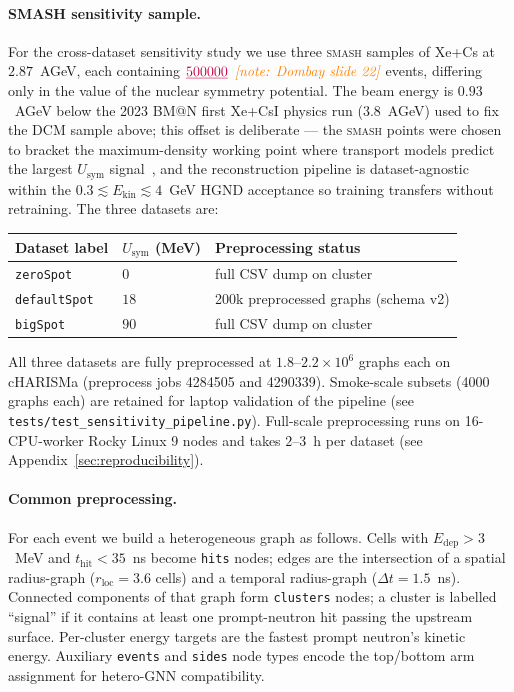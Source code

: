 \documentclass[aps,prc,twocolumn,superscriptaddress,showpacs,%
               nofootinbib,floatfix,longbibliography]{revtex4-2}
\makeatletter
\newcommand{\NOTE}[1]{{\color{orange}\textit{[note: #1]}}}
\newcommand{\NUM}[3]{{\color{purple}\underline{#1}~#2}\,\NOTE{#3}}
\newcommand{\Ekin}{E_{\text{kin}}}
\newcommand{\Usym}{U_{\text{sym}}}
\newcommand{\HGND}{HGND}
\newcommand{\BMN}{BM@N}
\newcommand{\SMASH}{\textsc{smash}}
\makeatother
\begin{document}
\paragraph*{SMASH sensitivity sample.}
For the cross-dataset sensitivity study we use three \SMASH{}
\cite{SMASH}
samples of Xe+Cs at $2.87$~AGeV, each containing
$\NUM{500000}{}{Dombay slide 22}$ events, differing only in the
value of the nuclear symmetry potential.  The beam energy is
$0.93$~AGeV below the 2023 \BMN{} first Xe+CsI physics run
($3.8$~AGeV) used to fix the DCM sample above; this offset is
deliberate --- the \SMASH{} points were chosen to bracket the
maximum-density working point where transport models predict the
largest $\Usym$ signal~\cite{Sorensen2024EoS, LiChen2008SymEnergy}, and
the reconstruction pipeline is dataset-agnostic within the
$0.3 \lesssim \Ekin \lesssim 4$~GeV \HGND{} acceptance so training
transfers without retraining.  The three datasets are:
\begin{center}
  \begin{tabular}{@{}lll@{}}
    \toprule
    Dataset label     & $\Usym$ (MeV)  & Preprocessing status \\
    \midrule
    \texttt{zeroSpot}    & $0$   & full CSV dump on cluster            \\
    \texttt{defaultSpot} & $18$  & 200k preprocessed graphs (schema v2)\\
    \texttt{bigSpot}     & $90$  & full CSV dump on cluster            \\
    \bottomrule
  \end{tabular}
\end{center}
All three datasets are fully preprocessed at
$1.8$--$2.2 \times 10^{6}$ graphs each on cHARISMa
(preprocess jobs 4284505 and 4290339).  Smoke-scale subsets
(\num{4000} graphs each) are retained for laptop validation of
the pipeline (see \texttt{tests/test\_sensitivity\_pipeline.py}).
Full-scale preprocessing runs on 16-CPU-worker Rocky Linux 9 nodes
and takes $2$--$3$~h per dataset (see
Appendix~\ref{sec:reproducibility}).

\paragraph*{Common preprocessing.}
For each event we build a heterogeneous graph as follows.  Cells with
$E_{\text{dep}} > 3$~MeV and $t_{\text{hit}} < 35$~ns become
\texttt{hits} nodes; edges are the intersection of a spatial
radius-graph ($r_{\text{loc}} = 3.6$ cells) and a temporal
radius-graph ($\Delta t = 1.5$~ns).  Connected components of that
graph form \texttt{clusters} nodes; a cluster is labelled ``signal''
if it contains at least one prompt-neutron hit passing the upstream
surface.  Per-cluster energy targets are the fastest prompt neutron's
kinetic energy.  Auxiliary \texttt{events} and \texttt{sides}
node types encode the top/bottom arm assignment for hetero-GNN
compatibility.
\end{document}
